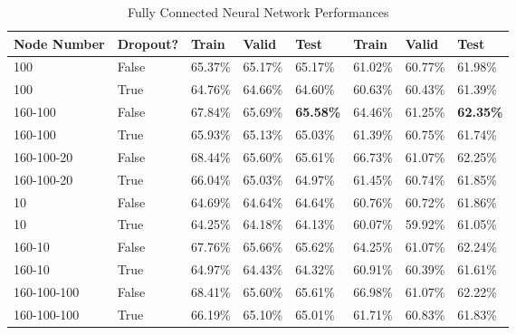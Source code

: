 \documentclass{article}
\begin{document}
\begin{appendix}
{\begin{table}[htb]
\begin{tabularx}{\textwidth}{ |X|l|l|l|l|l|l|l| }
\textbf{Node Number} & \textbf{Dropout?} & \textbf{Train} & \textbf{Valid} & \textbf{Test}  & \textbf{Train} & \textbf{Valid} & \textbf{Test}\\
\hline
100 & False & 65.37\% & 65.17\% & 65.17\% & 61.02\% & 60.77\% & 61.98\% \\
\hline
100 & True & 64.76\% & 64.66\% & 64.60\% & 60.63\% & 60.43\% & 61.39\% \\
\hline
160-100 & False & 67.84\% & 65.69\% & \textbf{65.58\%} & 64.46\% & 61.25\% & \textbf{62.35\%} \\
\hline
160-100 & True & 65.93\% & 65.13\% & 65.03\% & 61.39\% & 60.75\% & 61.74\% \\
\hline
160-100-20 & False & 68.44\% & 65.60\% & 65.61\% & 66.73\% & 61.07\% & 62.25\% \\
\hline
160-100-20 & True & 66.04\% & 65.03\% & 64.97\% & 61.45\% & 60.74\% & 61.85\% \\
\hline
10 & False & 64.69\% & 64.64\% & 64.64\% & 60.76\% & 60.72\% & 61.86\% \\
\hline
10 & True & 64.25\% & 64.18\% & 64.13\% & 60.07\% & 59.92\% & 61.05\% \\
\hline
160-10 & False & 67.76\% & 65.66\% & 65.62\% & 64.25\% & 61.07\% & 62.24\% \\
\hline
160-10 & True & 64.97\% & 64.43\% & 64.32\% & 60.91\% & 60.39\% & 61.61\% \\
\hline
160-100-100 & False & 68.41\% & 65.60\% & 65.61\% & 66.98\% & 61.07\% & 62.22\% \\
\hline
160-100-100 & True & 66.19\% & 65.10\% & 65.01\% & 61.71\% & 60.83\% & 61.83\% \\
\hline
\end{tabularx}
\caption{Fully Connected Neural Network Performances}
\label{table:FCC}
\end{table}}
\egroup



\end{appendix}
\end{document}
